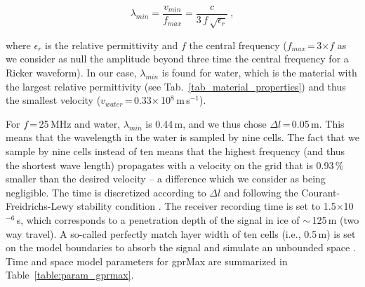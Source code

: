 \begin{equation}
   \lambda_{min} = \frac{v_{min}}{f_{max}} = \frac{c}{3\,f\,\sqrt{\epsilon_r}}~,
\end{equation}

where $\epsilon_r$ is the relative permittivity and $f$ the central frequency ($f_{max}$\,=\,3$\times f$ as we consider as null the amplitude beyond three time the central frequency for a Ricker waveform). In our case, $\lambda_{min}$ is found for water, which is the material with the largest relative permittivity (see Tab.~\ref{tab_material_properties}) and thus the smallest velocity ($v_{water}$\,=\,0.33$\times$\,10$^{8}$\,m\,s$^{-1}$). 

For $f$\,=\,25\,MHz and water, $\lambda_{min}$ is 0.44\,m, and we thus chose $\Delta l$\,=\,0.05\,m. This means that the wavelength in the water is sampled by nine cells. The fact that we sample by nine cells instead of ten means that the highest frequency (and thus the shortest wave length) propagates with a velocity on the grid that is 0.93\,\% smaller than the desired velocity \citep{Schneider2010} -- a difference which we consider as being negligible. The time is discretized according to $\Delta l$ and following the Courant-Freidrichs-Lewy stability condition \citep{Warren&al2016}. The receiver recording time is set to 1.5$\times$10$^{-6}$\,s, which corresponds to a penetration depth of the signal in ice of $\sim$\,125\,m (two way travel). A so-called perfectly match layer width of ten cells (i.e., 0.5\,m) is set on the model boundaries to absorb the signal and simulate an unbounded space \citep{Berenger1996}. Time and space model parameters for gprMax are summarized in Table~\ref{table:param_gprmax}.


